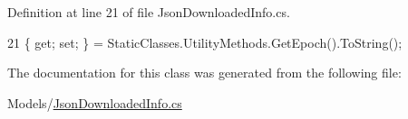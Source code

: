 Definition at line 21 of file Json\+Downloaded\+Info.\+cs.


\begin{DoxyCode}
21 \{ \textcolor{keyword}{get}; \textcolor{keyword}{set}; \} = StaticClasses.UtilityMethods.GetEpoch().ToString();
\end{DoxyCode}


The documentation for this class was generated from the following file\+:\begin{DoxyCompactItemize}
\item 
Models/\mbox{\hyperlink{_json_downloaded_info_8cs}{Json\+Downloaded\+Info.\+cs}}\end{DoxyCompactItemize}
